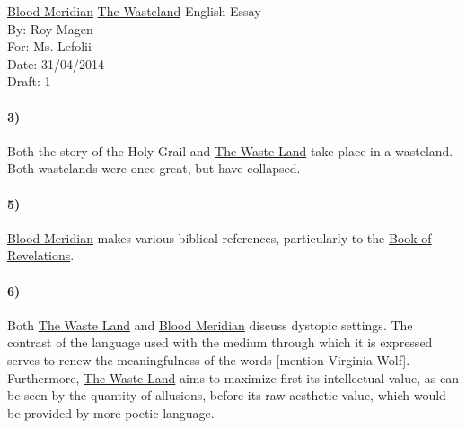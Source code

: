 \documentclass[12pt]{article}
\begin{document}
	\begin{titlepage}
		\noindent \uline{Blood Meridian} \uline{The Wasteland} English Essay \\
		By: Roy Magen \\
		For:  Ms. Lefolii \\
		Date: 31/04/2014 \\
		Draft: 1
	\end{titlepage}

	\paragraph{3)}
		Both the story of the Holy Grail and \uline{The Waste Land}
		take place in a wasteland. Both wastelands were once great, but
		have collapsed.	
	
	\paragraph{5)}
		\uline{Blood Meridian} makes various biblical references,
		particularly to the \uline{Book of Revelations}.

	\paragraph{6)}
		Both \uline{The Waste Land} and \uline{Blood Meridian} discuss
		dystopic settings. The contrast of the language used with the
		medium through which it is expressed serves to renew the
		meaningfulness of the words [mention Virginia Wolf].
		Furthermore, \uline{The Waste Land} aims to maximize first
		its intellectual value, as can be seen by the quantity of
		allusions, before its raw aesthetic value, which would be
		provided by more poetic language. 
\end{document}
